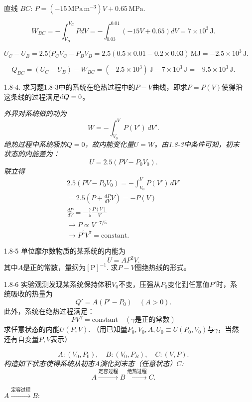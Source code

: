 \begin{enumerate}
{			直线 $BC$: $P = (-15\, \mathrm{MPa \, m^{-3}}) V + 0.65\, \mathrm{MPa}$.

			\[ W_{BC} = -\int_{V_B}^{V_C} PdV = -\int_{0.03}^{0.01} (-15V + 0.65) dV = 7 \times 10^3 \,\mathrm{J}. \]

			\[ U_C - U_B = 2.5(P_C V_C - P_B V_B = 2.5(0.5\times 0.01 - 0.2 \times 0.03) \,\mathrm{MJ} = -2.5 \times 10^3 \,\mathrm{J}. \]

			\[ Q_{BC} = (U_C - U_B) - W_{BC} = (-2.5 \times 10^3) \,\mathrm{J} - 7 \times 10^{3} \,\mathrm{J} = -9.5 \times 10^3 \,\mathrm{J}. \]
		}

	\item[1.8-4.]
		求习题1.8-3中的系统在绝热过程中的$P-V$曲线，即求$P = P(V)$使得沿这条线的过程满足$\mathrm d\hspace*{-0.1em}\bar{}\hspace*{0.08em} Q = 0$。

		{\it
			外界对系统做的功为
				\[ W = -\int_{V_0}^{V} P(V') \, dV'. \]
			绝热过程中系统吸热$Q = 0$，故内能变化量$U = W$。由1.8-3中条件可知，初末状态的内能差为：
				\[ U = 2.5(P V - P_0 V_0). \]
			联立得
				\begin{align*}
					2.5 (PV - P_0 V_0) = -\int_{V_0}^V P(V') \, dV' \\
					= 2.5 \left(P + \frac{dP}{dV} V \right) = -P(V) \\
					\frac{dP}{dV} = -\frac{7}{5} \frac{P(V)}{V} \\
					\to P \propto V^{-7/5} \\
					\to P^5 V^7 = \mathrm{constant}.
				\end{align*}
		}
	\item[1.8-5]
		单位摩尔数物质的某系统的内能为
		\[ U = AP^2 V. \]
		其中$A$是正的常数，量纲为$[\mathrm{P}]^{-1}$. 求$P-V$图绝热线的形式。

	\item[1.8-6]
		实验观测发现某系统保持体积$V_0$不变，压强从$P_0$变化到任意值$P'$时，系统吸收的热量为
		\[ Q' = A(P' - P_0) \quad(A > 0). \]
		此外，系统在绝热过程满足：
		\[ P V^\gamma = \text{constant} \quad (\gamma\text{是正的常数}) \]
		求任意状态的内能$U(P, V)$. （用已知量$P_0, V_0, A, U_0 \equiv U(P_0, V_0)\text{与} \gamma$，当然还有自变量$P, V$表示）

		{\it
			\[ A: (V_0, P_0), \quad B: (V_0, P_B), \quad C: (V, P). \]
			构造如下状态使得系统从初态$A$演化到末态（任意状态）$C$:
			\[ A \stackrel{\text{定容过程}}{\longrightarrow} B \stackrel{\text{绝热过程}}{\longrightarrow} C. \]

			$A \stackrel{\text{定容过程}}{\longrightarrow} B$: 
				
}
\end{enumerate}
